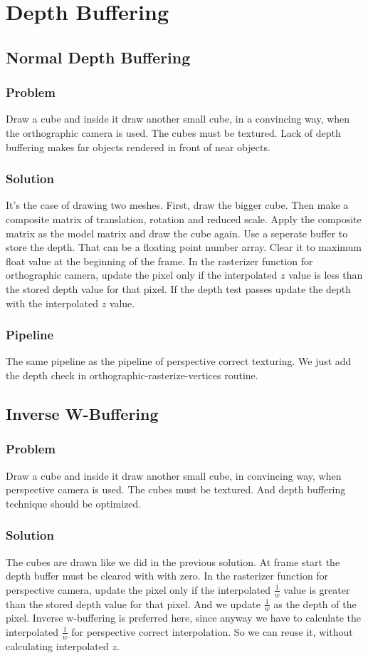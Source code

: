\chapter{Depth Buffering}
\section{Normal Depth Buffering}
\subsection{Problem}
Draw a cube and inside it draw another small cube, in a convincing way, when the orthographic camera is used. The cubes must be textured. Lack of depth buffering makes far objects rendered in front of near objects. 
\subsection{Solution}
It's the case of drawing two meshes. First, draw the bigger cube. Then make a composite matrix of translation, rotation and reduced scale. Apply the composite matrix as the model matrix and draw the cube again. Use a seperate buffer to store the depth. That can be a floating point number array. Clear it to maximum float value at the beginning of the frame. In the rasterizer function for orthographic camera, update the pixel only if the interpolated $z$ value is less than the stored depth value for that pixel. If the depth test passes update the depth with the interpolated $z$ value.
\subsection{Pipeline}
The same pipeline as the pipeline of perspective correct texturing. We just add the depth check in orthographic-rasterize-vertices routine.
\section{Inverse W-Buffering}
\subsection{Problem}
Draw a cube and inside it draw another small cube, in convincing way, when perspective camera is used. The cubes must be textured. And depth buffering technique should be optimized.
\subsection{Solution}
The cubes are drawn like we did in the previous solution. At frame start the depth buffer must be cleared with with zero. In the rasterizer function for perspective camera, update the pixel only if the interpolated $\frac{1}{w}$ value is greater than the stored depth value for that pixel. And we update  $\frac{1}{w}$ as the depth of the pixel.
Inverse w-buffering is preferred here, since anyway we have to calculate the interpolated $\frac{1}{w}$ for perspective correct interpolation. So we can reuse it, without calculating interpolated $z$.
